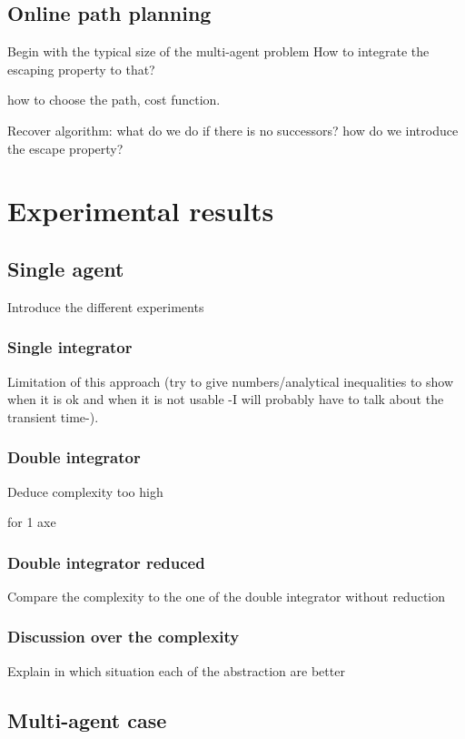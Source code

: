 \documentclass[notitlepage]{article}
\theoremstyle{named}
\begin{document}
\subsection{Online path planning}
Begin with the typical size of the multi-agent problem
How to integrate the escaping property to that?

how to choose the path, cost function.

Recover algorithm: what do we do if there is no successors? how do we introduce the escape property?

\section{Experimental results}

\subsection{Single agent}
Introduce the different experiments

\subsubsection{Single integrator}
Limitation of this approach (try to give numbers/analytical inequalities to show when it is ok and when it is not usable -I will probably have to talk about the transient time-).

\subsubsection{Double integrator}
Deduce complexity too high

for 1 axe

\subsubsection{Double integrator reduced}
Compare the complexity to the one of the double integrator without reduction

\subsubsection{Discussion over the complexity}
Explain in which situation each of the abstraction are better

\subsection{Multi-agent case}
\end{document}
